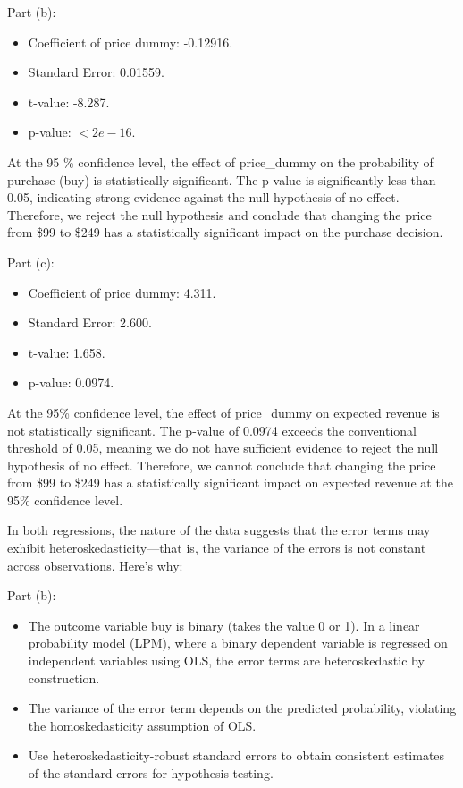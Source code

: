 \documentclass{article}
\begin{document}
Part (b):

\begin{itemize}
    \item Coefficient of price dummy: -0.12916.
    \item Standard Error: 0.01559.
    \item t-value: -8.287.
    \item p-value: $< 2e-16$.
\end{itemize}

At the 95 \% confidence level, the effect of price\_dummy on the probability of purchase (buy) is statistically significant.
The p-value is significantly less than 0.05, indicating strong evidence against the null hypothesis of no effect. Therefore, we reject the null hypothesis and conclude that changing the price from \$99 to \$249 has a statistically significant impact on the purchase decision.

Part (c):

\begin{itemize}
    \item Coefficient of price dummy: 4.311.
    \item Standard Error: 2.600.
    \item t-value: 1.658.
    \item p-value: 0.0974.
\end{itemize}

At the 95\% confidence level, the effect of price\_dummy on expected revenue is not statistically significant. The p-value of 0.0974 exceeds the conventional threshold of 0.05, meaning we do not have sufficient evidence to reject the null hypothesis of no effect. Therefore, we cannot conclude that changing the price from \$99 to \$249 has a statistically significant impact on expected revenue at the 95\% confidence level.

In both regressions, the nature of the data suggests that the error terms may exhibit heteroskedasticity—that is, the variance of the errors is not constant across observations. Here's why:

Part (b):

\begin{itemize}
    \item The outcome variable buy is binary (takes the value 0 or 1). In a linear probability model (LPM), where a binary dependent variable is regressed on independent variables using OLS, the error terms are heteroskedastic by construction.
    \item The variance of the error term depends on the predicted probability, violating the homoskedasticity assumption of OLS.
    \item Use heteroskedasticity-robust standard errors to obtain consistent estimates of the standard errors for hypothesis testing.
\end{itemize}
\end{document}
